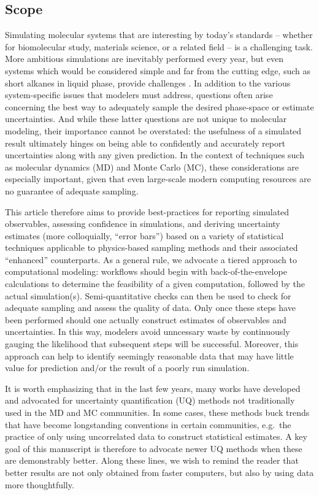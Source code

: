 \subsection{Scope}

Simulating molecular systems that are interesting by today's standards -- whether for biomolecular study, materials science, or a related field -- is a challenging task.
More ambitious simulations are inevitably performed every year, but even systems which would be considered simple and far from the cutting edge, such as short alkanes in liquid phase, provide challenges \cite{Schappals2017}.
In addition to the various system-specific issues that modelers must address, questions often arise concerning the best way to adequately sample the desired phase-space or estimate uncertainties.  And while these latter questions are not unique to molecular modeling, their importance cannot be overstated: the usefulness of a simulated result ultimately hinges on being able to confidently and accurately report uncertainties along with any given prediction.  In the context of techniques such as molecular dynamics (MD) and Monte Carlo (MC), these considerations are especially important, given that even large-scale modern computing resources are no guarantee of adequate sampling.

This article therefore aims to provide best-practices for reporting simulated observables, assessing confidence in simulations, and deriving uncertainty estimates (more colloquially, ``error bars'') based on a variety of statistical techniques applicable to physics-based sampling methods and their associated ``enhanced'' counterparts.  As a general rule, we advocate a tiered approach to computational modeling: workflows should begin with back-of-the-envelope calculations to determine the feasibility of a given computation, followed by the actual simulation(s).  Semi-quantitative checks can then be used to check for adequate sampling and assess the quality of data.  Only once these steps have been performed should one actually construct estimates of observables and uncertainties.  In this way, modelers avoid unncessary waste by continuously gauging the likelihood that subsequent steps will be successful.  Moreover, this approach can help to identify seemingly reasonable data that may have little value for prediction and/or the result of a poorly run simulation.

It is worth emphasizing that in the last few years, many works have developed and advocated for uncertainty quantification (UQ) methods not traditionally used in the MD and MC communities.  In some cases, these methods buck trends that have become longstanding conventions in certain communities, e.g.\ the practice of only using uncorrelated data to construct statistical estimates.  A key goal of this manuscript is therefore to advocate newer UQ methods when these are demonstrably better.  Along these lines, we wish to remind the reader that better results are not only obtained from faster computers, but also by using data more thoughtfully.  

